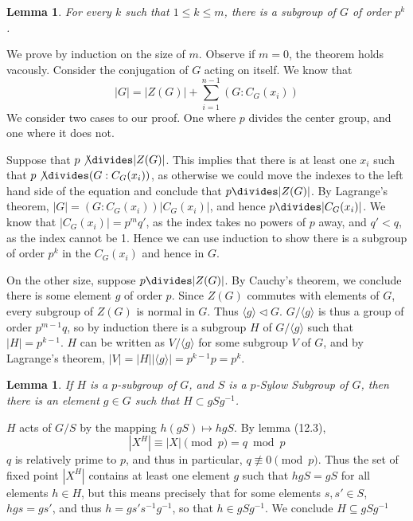 \documentclass[12pt]{amsbook}
\makeatletter
\theoremstyle{plain}
\newtheorem{lemma}[theorem]{Lemma}
\theoremstyle{definition}
\renewenvironment{proof}[1][\proofname]{\par
  \pushQED{\qed}%
  \normalfont \topsep6\p@\@plus6\p@\relax
  \list{}{\leftmargin=0em
          \rightmargin=\leftmargin
          \settowidth{\itemindent}{\itshape#1}%
          \labelwidth=\itemindent}

  \item[\hskip\labelsep
        \itshape
    #1\@addpunct{.}]\ignorespaces
}{%
  \popQED\endlist\@endpefalse
}
\makeatother
\begin{document}
\begin{lemma}
    For every $k$ such that $1 \leq k \leq m$, there is a subgroup of $G$ of order $p^k$.
\end{lemma}
\begin{proof}
    We prove by induction on the size of $m$. Observe if $m = 0$, the theorem holds vacously. Consider the conjugation of $G$ acting on itself. We know that
    \[ |G| = |Z(G)| + \sum_{i = 1}^{n-1} (G:C_G(x_i)) \]
    We consider two cases to our proof. One where $p$ divides the center group, and one where it does not.

    Suppose that $p \not\divides |Z(G)|$. This implies that there is at least one $x_i$ such that $p \not \divides (G:C_G(x_i))$, as otherwise we could move the indexes to the left hand side of the equation and conclude that $p \divides|Z(G)|$. By Lagrange's theorem, $|G| = (G:C_G(x_i))|C_G(x_i)|$, and hence $p \divides |C_G(x_i)|$. We know that $|C_G(x_i)| = p^{m}q'$, as the index takes no powers of $p$ away, and $q' < q$, as the index cannot be 1. Hence we can use induction to show there is a subgroup of order $p^k$ in the $C_G(x_i)$ and hence in $G$.

    On the other size, suppose $p \divides |Z(G)|$. By Cauchy's theorem, we conclude there is some element $g$ of order $p$. Since $Z(G)$ commutes with elements of $G$, every subgroup of $Z(G)$ is normal in $G$. Thus $\langle g \rangle \lhd G$. $G/\langle g \rangle$ is thus a group of order $p^{m-1}q$, so by induction there is a subgroup $H$ of $G/\langle g\rangle$ such that $|H| = p^{k-1}$. $H$ can be written as $V/\langle g \rangle$ for some subgroup $V$ of $G$, and by Lagrange's theorem, $|V| = |H||\langle g \rangle| = p^{k-1}p = p^k$.
\end{proof}

\begin{lemma}
    If $H$ is a $p$-subgroup of $G$, and $S$ is a $p$-Sylow Subgroup of $G$, then there is an element $g \in G$ such that $H \subset gSg^{-1}$.
\end{lemma}
\begin{proof}
    $H$ acts of $G/S$ by the mapping $h(gS) \mapsto hgS$. By lemma (12.3),
    \[ |X^H| \equiv |X| \pmod{p} = q \bmod{p} \]
    $q$ is relatively prime to $p$, and thus in particular, $q \not \equiv 0 \pmod{p}$. Thus the set of fixed point $|X^H|$ contains at least one element $g$ such that $hgS = gS$ for all elements $h \in H$, but this means precisely that for some elements $s,s' \in S$, $hgs = gs'$, and thus $h = gs's^{-1}g^{-1}$, so that $h \in gSg^{-1}$. We conclude $H \subseteq gSg^{-1}$
\end{proof}
\end{document}
